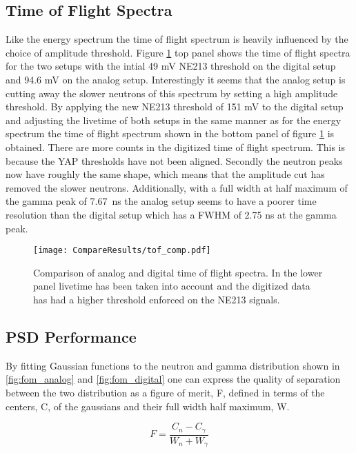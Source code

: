 \documentclass[main.tex]{subfiles}
\begin{document}
\subsection{Time of Flight Spectra}
Like the energy spectrum the time of flight spectrum is heavily influenced by the choice of amplitude threshold. Figure \ref{fig:tof_comp} top panel shows the time of flight spectra for the two setups with the intial 49 mV NE213 threshold on the digital setup and 94.6 mV on the analog setup. Interestingly it seems that the analog setup is cutting away the slower neutrons of this spectrum by setting a high amplitude threshold. By applying the new NE213 threshold of 151 mV to the digital setup and adjusting the livetime of both setups in the same manner as for the energy spectrum the time of flight spectrum shown in the bottom panel of figure \ref{fig:tof_comp} is obtained. There are more counts in the digitized time of flight spectrum. This is because the YAP thresholds have not been aligned. Secondly the neutron peaks now have roughly the same shape, which means that the amplitude cut has removed the slower neutrons. Additionally, with a full width at half maximum of the gamma peak of \SI{7.67}{\ns} the analog setup seems to have a poorer time resolution than the digital setup which has a FWHM of 2.75 ns at the gamma peak.

\begin{figure}[h]
    \centering
        \texttt{[image: CompareResults/tof\_comp.pdf]}
        \caption[Comparison of analog and digital time of flight spectra.]{Comparison of analog and digital time of flight spectra. In the lower panel livetime has been taken into account and the digitized data has had a higher threshold enforced on the NE213 signals.}
    \label{fig:tof_comp}
\end{figure}

\subsection{PSD Performance}
By fitting Gaussian functions to the neutron and gamma distribution shown in \ref{fig:fom_analog} and \ref{fig:fom_digital} one can express the quality of separation between the two distribution as a figure of merit, F, defined in terms of the centers, C, of the gaussians and their full width half maximum, W. 

\begin{equation}
F = \frac{C_n - C_\gamma}{W_n + W_\gamma}
\end{equation}
\end{document}
